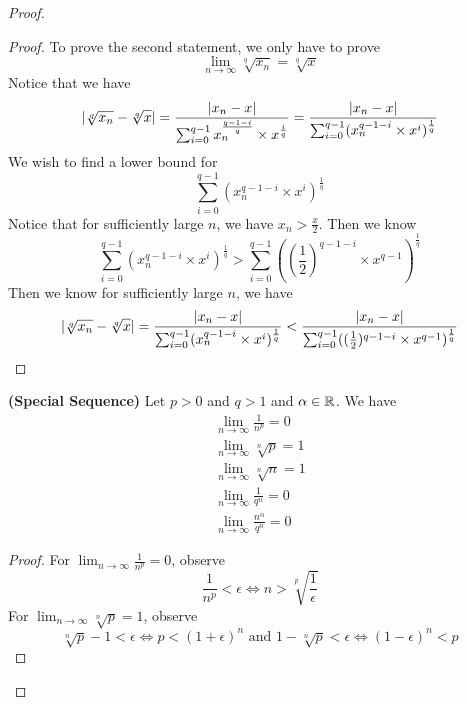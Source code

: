 \documentclass{report}
\begin{document}
\begin{proof}
\begin{proof}
To prove the second statement, we only have to prove
\begin{equation}
\lim_{n\to\infty} \sqrt[q]{x_n} =\sqrt[q]{x} 
\end{equation}
Notice that we have
\begin{equation}
|\sqrt[q]{x_n}-\sqrt[q]{x}|=\frac{|x_n-x|}{\sum_{i=0}^{q-1}x_n^{\frac{q-1-i}{q}}\times x^{\frac{i}{q}}}=\frac{|x_n-x|}{\sum_{i=0}^{q-1}(x_n^{q-1-i}\times x^i)^{\frac{1}{q}}}
\end{equation}
We wish to find a lower bound for 
\begin{equation}
\sum_{i=0}^{q-1}(x_n^{q-1-i}\times x^i)^{\frac{1}{q}}
\end{equation}
Notice that for sufficiently large $n$, we have $x_n>\frac{x}{2}$. Then we know
 \begin{equation}
\sum_{i=0}^{q-1}(x_n^{q-1-i}\times x^i)^{\frac{1}{q}}>\sum_{i=0}^{q-1}((\frac{1}{2})^{q-1-i}\times x^{q-1} )^{\frac{1}{q}}
\end{equation}
Then we know for sufficiently large $n$, we have
 \begin{equation}
|\sqrt[q]{x_n}-\sqrt[q]{x} |=\frac{|x_n-x|}{\sum_{i=0}^{q-1}(x_n^{q-1-i}\times x^i)^{\frac{1}{q}}}<\frac{|x_n-x|}{\sum_{i=0}^{q-1}((\frac{1}{2})^{q-1-i}\times x^{q-1})^{\frac{1}{q}}}
\end{equation}
\end{proof}
\begin{theorem}
\label{4.1.9}
\textbf{(Special Sequence)} Let $p>0$ and $q>1$ and $\alpha \in\mathbb{R}$. We have
\begin{gather}
\lim_{n\to\infty}\frac{1}{n^p}=0\\
\lim_{n\to\infty}\sqrt[n]{p}=1\\
\lim_{n\to\infty}\sqrt[n]{n}=1\\
\lim_{n\to\infty}\frac{1}{q^n}=0\\
\lim_{n\to\infty}\frac{n^{\alpha }}{q^n}=0
\end{gather}
\end{theorem}
\begin{proof}
For $\lim_{n\to\infty}\frac{1}{n^p}=0$, observe
\begin{equation}
\frac{1}{n^p}<\epsilon \iff n>\sqrt[p]{\frac{1}{\epsilon }}  
\end{equation}
For $\lim_{n\to\infty}\sqrt[n]{p}=1$, observe
\begin{equation}
\sqrt[n]{p}-1<\epsilon  \iff p<(1+\epsilon )^n\text{ and }1-\sqrt[n]{p}<\epsilon \iff (1-\epsilon )^n<p  
\end{equation}

\end{proof}
\end{proof}
\end{document}

